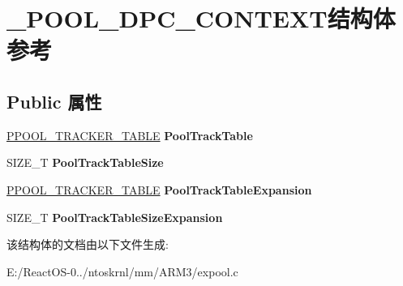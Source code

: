 \hypertarget{struct___p_o_o_l___d_p_c___c_o_n_t_e_x_t}{}\section{\+\_\+\+P\+O\+O\+L\+\_\+\+D\+P\+C\+\_\+\+C\+O\+N\+T\+E\+X\+T结构体 参考}
\label{struct___p_o_o_l___d_p_c___c_o_n_t_e_x_t}
\subsection*{Public 属性}
\begin{DoxyCompactItemize}
\item 
\mbox{\label{struct___p_o_o_l___d_p_c___c_o_n_t_e_x_t_aa42d69b3e282941ffe4b54b24937b4c1}} 
\hyperlink{struct___p_o_o_l___t_r_a_c_k_e_r___t_a_b_l_e}{P\+P\+O\+O\+L\+\_\+\+T\+R\+A\+C\+K\+E\+R\+\_\+\+T\+A\+B\+LE} {\bfseries Pool\+Track\+Table}
\item 
\mbox{\label{struct___p_o_o_l___d_p_c___c_o_n_t_e_x_t_a54795d77b9303043c54691567d509274}} 
S\+I\+Z\+E\+\_\+T {\bfseries Pool\+Track\+Table\+Size}
\item 
\mbox{\label{struct___p_o_o_l___d_p_c___c_o_n_t_e_x_t_a9a11ec6c45586072bdd8263bec6080d5}} 
\hyperlink{struct___p_o_o_l___t_r_a_c_k_e_r___t_a_b_l_e}{P\+P\+O\+O\+L\+\_\+\+T\+R\+A\+C\+K\+E\+R\+\_\+\+T\+A\+B\+LE} {\bfseries Pool\+Track\+Table\+Expansion}
\item 
\mbox{\label{struct___p_o_o_l___d_p_c___c_o_n_t_e_x_t_afc44b924b334957657f6b81694c3dce5}} 
S\+I\+Z\+E\+\_\+T {\bfseries Pool\+Track\+Table\+Size\+Expansion}
\end{DoxyCompactItemize}


该结构体的文档由以下文件生成\+:\begin{DoxyCompactItemize}
\item 
E\+:/\+React\+O\+S-\/0../ntoskrnl/mm/\+A\+R\+M3/expool.\+c\end{DoxyCompactItemize}

